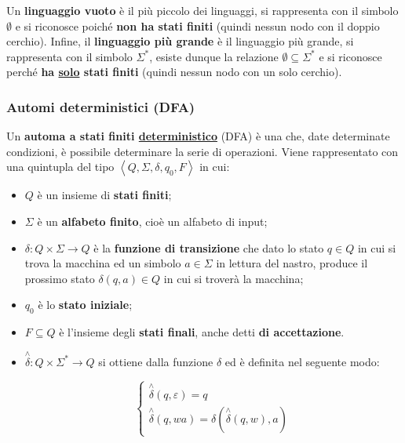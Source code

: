 \documentclass[a4paper]{article}
\begin{document}
	Un \textcolor{Red3}{\textbf{linguaggio vuoto}} è il più piccolo dei linguaggi, si rappresenta con il simbolo $\emptyset$ e si riconosce poiché \textbf{non ha stati finiti} (quindi nessun nodo con il doppio cerchio). Infine, il \textcolor{Red3}{\textbf{linguaggio più grande}} è il linguaggio più grande, si rappresenta con il simbolo $\Sigma^{*}$, esiste dunque la relazione $\emptyset \subseteq \Sigma^{*}$ e si riconosce perché \textbf{ha \underline{solo} stati finiti} (quindi nessun nodo con un solo cerchio).

	\newpage

	\subsubsection{Automi deterministici (DFA)}\label{automi deterministici}
	
	Un \textbf{automa a stati finiti \underline{deterministico}} (DFA) è una che, date determinate condizioni, è possibile determinare la serie di operazioni. Viene rappresentato con una quintupla del tipo $\left\langle Q, \Sigma, \delta, q_0, F\right\rangle$ in cui:
	
	\begin{itemize}
		\item[\ding{42}] $Q$ è un insieme di \textcolor{Red3}{\textbf{stati finiti}};
		
		\item[\ding{42}] $\Sigma$ è un \textcolor{Red3}{\textbf{alfabeto finito}}, cioè un alfabeto di input;
		
		\item[\ding{42}] $\delta: Q \times \Sigma \longrightarrow Q$ è la \textcolor{Red3}{\textbf{funzione di transizione}} che dato lo stato $q \in Q$ in cui si trova la macchina ed un simbolo $a \in \Sigma$ in lettura del nastro, produce il prossimo stato $\delta (q,a) \in Q$ in cui si troverà la macchina;
		
		\item[\ding{42}] $q_0$ è lo \textcolor{Red3}{\textbf{stato iniziale}};
		
		\item[\ding{42}] $F \subseteq Q$ è l'insieme degli \textcolor{Red3}{\textbf{stati finali}}, anche detti \textbf{di accettazione}.
		
		\item[\ding{42}] $\overset{\wedge}{\delta}: Q \times \Sigma^{*} \longrightarrow Q$ si ottiene dalla funzione $\delta$ ed è definita nel seguente modo:
		
		\begin{equation*}
			\begin{cases}
				\overset{\wedge}{\delta}(q, \varepsilon) = q \\
				\overset{\wedge}{\delta}(q, wa) = \delta \left(\overset{\wedge}{\delta}(q, w), a\right)
			\end{cases}
		\end{equation*}
	\end{itemize}
\end{document}
